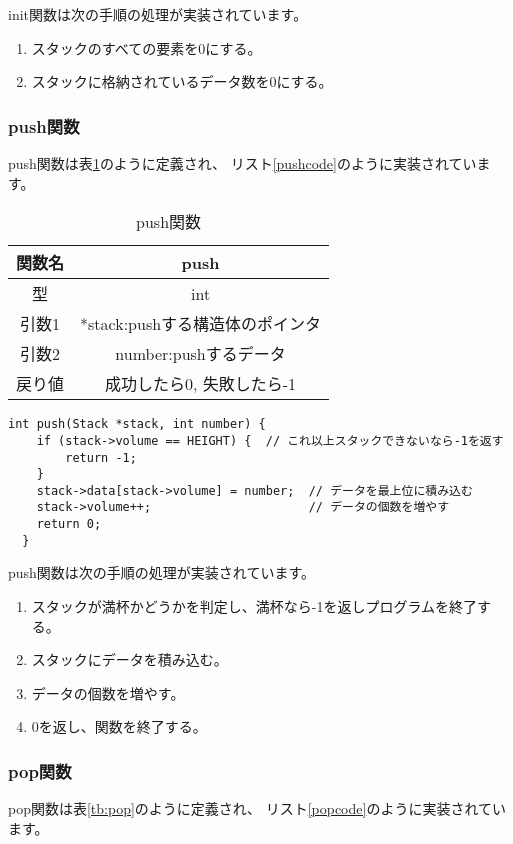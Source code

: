 \documentclass[a4j]{jarticle}
\begin{document}
init関数は次の手順の処理が実装されています。
\begin{enumerate}
  \item スタックのすべての要素を0にする。
  \item スタックに格納されているデータ数を0にする。
\end{enumerate}

\subsubsection{push関数}
push関数は表\ref{tb:push}のように定義され、
リスト\ref{pushcode}のように実装されています。

\begin{table}[h]
  \centering
  \caption{push関数}
  \label{tb:push}
  \begin{tabular}{|c|c|}
    \hline
    関数名 & push                  \\
    \hline
    型   & int                   \\
    \hline
    引数1 & *stack:pushする構造体のポインタ \\
    \hline
    引数2 & number:pushするデータ      \\
    \hline
    戻り値 & 成功したら0, 失敗したら-1       \\
    \hline
  \end{tabular}
\end{table}

\begin{lstlisting}[caption=push関数,label=pushcode]
  int push(Stack *stack, int number) {
    if (stack->volume == HEIGHT) {  // これ以上スタックできないなら-1を返す
        return -1;
    }
    stack->data[stack->volume] = number;  // データを最上位に積み込む
    stack->volume++;                      // データの個数を増やす
    return 0;
  }
  \end{lstlisting}

push関数は次の手順の処理が実装されています。
\begin{enumerate}
  \item スタックが満杯かどうかを判定し、満杯なら-1を返しプログラムを終了する。
  \item スタックにデータを積み込む。
  \item データの個数を増やす。
  \item 0を返し、関数を終了する。
\end{enumerate}

\subsubsection{pop関数}
pop関数は表\ref{tb:pop}のように定義され、
リスト\ref{popcode}のように実装されています。
\end{document}
